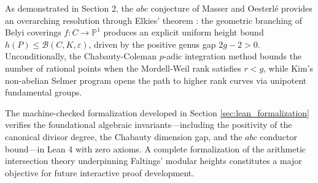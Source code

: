 \documentclass[11pt,a4paper]{article}
\theoremstyle{definition}
\begin{document}
As demonstrated in Section 2, the $abc$ conjecture of Masser and Oesterlé \cite{masser1985, oesterle1988} provides an overarching resolution through Elkies' theorem \cite{elkies1991}: the geometric branching of Belyi coverings $f: C \to \mathbb{P}^1$ produces an explicit uniform height bound $h(P) \le \mathcal{B}(C, K, \varepsilon)$, driven by the positive genus gap $2g - 2 > 0$. Unconditionally, the Chabauty-Coleman $p$-adic integration method \cite{chabauty1941, coleman1985} bounds the number of rational points when the Mordell-Weil rank satisfies $r < g$, while Kim's non-abelian Selmer program \cite{kim2005, kim2009} opens the path to higher rank curves via unipotent fundamental groups.

The machine-checked formalization developed in Section \ref{sec:lean_formalization} verifies the foundational algebraic invariants—including the positivity of the canonical divisor degree, the Chabauty dimension gap, and the $abc$ conductor bound—in Lean 4 with zero axioms. A complete formalization of the arithmetic intersection theory underpinning Faltings' modular heights constitutes a major objective for future interactive proof development.
\end{document}
